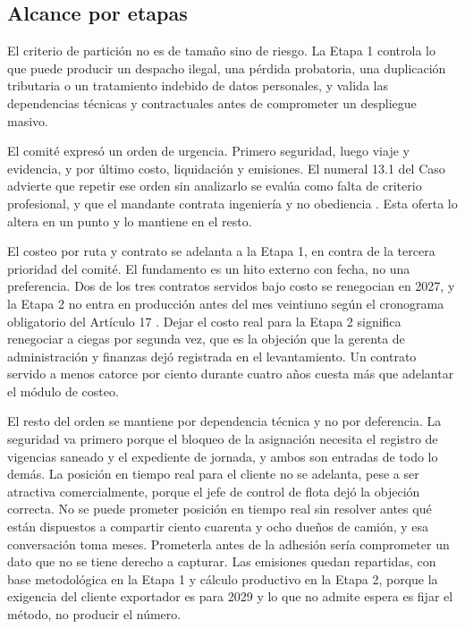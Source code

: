 \subsection{Alcance por etapas}

El criterio de partición no es de tamaño sino de riesgo. La Etapa 1 controla lo que puede producir
un despacho ilegal, una pérdida probatoria, una duplicación tributaria o un tratamiento indebido de
datos personales, y valida las dependencias técnicas y contractuales antes de comprometer un
despliegue masivo.

El comité expresó un orden de urgencia. Primero seguridad, luego viaje y evidencia, y por último
costo, liquidación y emisiones. El numeral 13.1 del Caso advierte que repetir ese orden sin
analizarlo se evalúa como falta de criterio profesional, y que el mandante contrata ingeniería y no
obediencia \parencite{bases_caso10_2026}. Esta oferta lo altera en un punto y lo mantiene en el
resto.

El costeo por ruta y contrato se adelanta a la Etapa 1, en contra de la tercera prioridad del
comité. El fundamento es un hito externo con fecha, no una preferencia. Dos de los tres contratos
servidos bajo costo se renegocian en 2027, y la Etapa 2 no entra en producción antes del mes
veintiuno según el cronograma obligatorio del Artículo 17 \parencite{bases_admin_2026}. Dejar el
costo real para la Etapa 2 significa renegociar a ciegas por segunda vez, que es la objeción que la
gerenta de administración y finanzas dejó registrada en el levantamiento. Un contrato servido a
menos catorce por ciento durante cuatro años cuesta más que adelantar el módulo de costeo.

El resto del orden se mantiene por dependencia técnica y no por deferencia. La seguridad va primero
porque el bloqueo de la asignación necesita el registro de vigencias saneado y el expediente de
jornada, y ambos son entradas de todo lo demás. La posición en tiempo real para el cliente no se
adelanta, pese a ser atractiva comercialmente, porque el jefe de control de flota dejó la objeción
correcta. No se puede prometer posición en tiempo real sin resolver antes qué están dispuestos a
compartir ciento cuarenta y ocho dueños de camión, y esa conversación toma meses. Prometerla antes
de la adhesión sería comprometer un dato que no se tiene derecho a capturar. Las emisiones quedan
repartidas, con base metodológica en la Etapa 1 y cálculo productivo en la Etapa 2, porque la
exigencia del cliente exportador es para 2029 y lo que no admite espera es fijar el método, no
producir el número.

